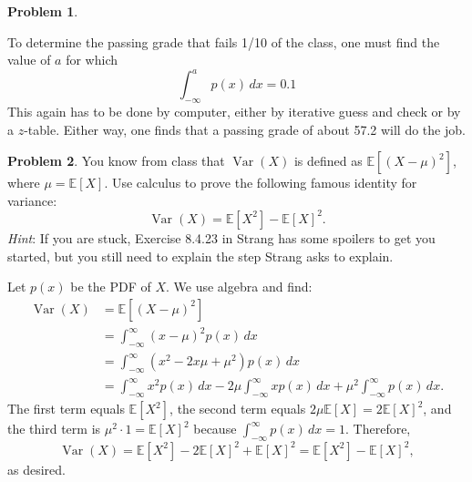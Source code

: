 \documentclass[11pt,oneside]{amsart}
\theoremstyle{definition}
\newtheorem{problem}{Problem}
\newcommand{\bE}{\mathbb{E}}
\DeclareMathOperator{\Var}{Var}
\begin{document}
\begin{problem}
\begin{enumerate}[(a)]
\begin{solution}
                To determine the passing grade that fails 1/10 of the class, one must find the value of $a$ for which
                \[\int_{-\infty}^{a}p(x)\,dx=0.1\]
                This again has to be done by computer, either by iterative guess and check or by a $z$-table. Either way, one finds that a passing grade of about 57.2 will do the job.
            \end{solution}
        \end{enumerate}
    \end{problem}

    \begin{problem}
        You know from class that $\Var(X)$ is defined as $\bE[(X-\mu)^2]$, where $\mu=\bE[X]$. Use calculus to prove the following famous identity for variance:
        \[\Var(X)=\bE[X^2]-\bE[X]^2.\]
        \emph{Hint}: If you are stuck, Exercise 8.4.23 in Strang has some spoilers to get you started, but you still need to explain the step Strang asks to explain.
    \end{problem}
    \begin{solution}
        Let $p(x)$ be the PDF of $X$. We use algebra and find:
        \[\begin{split}
            \Var(X) &= \bE[(X-\mu)^2] \\
            &=\int_{-\infty}^\infty (x-\mu)^2 p(x)\,dx\\
            &= \int_{-\infty}^\infty (x^2-2x\mu+\mu^2)p(x)\,dx\\
            &= \int_{-\infty}^\infty x^2 p(x)\,dx-2\mu\int_{-\infty}^\infty xp(x)\,dx+\mu^2 \int_{-\infty}^\infty p(x)\,dx.
        \end{split}\]
        The first term equals $\bE[X^2]$, the second term equals $2\mu \bE[X]=2\bE[X]^2$, and the third term is $\mu^2\cdot 1=\bE[X]^2$ because $\int_{-\infty}^\infty p(x)\,dx=1$. Therefore,
        \[\Var(X)=\bE[X^2]-2\bE[X]^2+\bE[X]^2=\bE[X^2]-\bE[X]^2,\]
        as desired.
    \end{solution}
    
\end{document}

